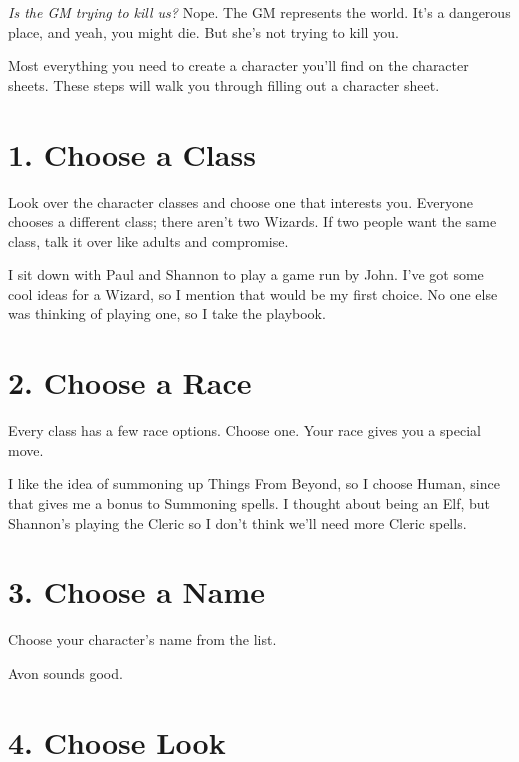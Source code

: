 

{\em Is the GM trying to kill us?}  Nope. The GM represents the world. It's a dangerous place, and yeah, you might die. But she's not trying to kill you.

 

Most everything you need to create a character you'll find on the character sheets. These steps will walk you through filling out a character sheet.

 
\section{1. Choose a Class}     
 

Look over the character classes and choose one that interests you. Everyone chooses a different class; there aren't two Wizards. If two people want the same class, talk it over like adults and compromise.

 
\startExample
I sit down with Paul and Shannon to play a game run by John. I've got some cool ideas for a Wizard, so I mention that would be my first choice. No one else was thinking of playing one, so I take the playbook.
\stopExample
 
\section{2. Choose a Race}     
 

Every class has a few race options. Choose one. Your race gives you a special move.

 
\startExample
I like the idea of summoning up Things From Beyond, so I choose Human, since that gives me a bonus to Summoning spells. I thought about being an Elf, but Shannon's playing the Cleric so I don't think we'll need more Cleric spells.
\stopExample
 
\section{3. Choose a Name}    
 

Choose your character’s name from the list.

 
\startExample
Avon sounds good.
\stopExample
 
\section{4. Choose Look}    
 

